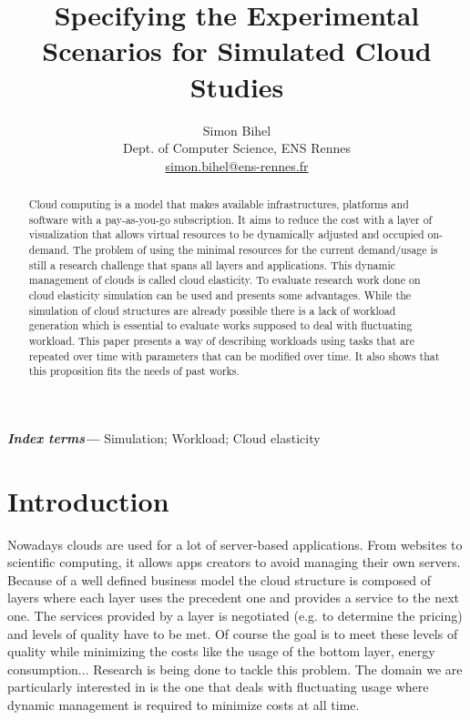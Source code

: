 \documentclass[a4paper, onecolumn, 11pt]{article}
\title{Specifying the Experimental Scenarios for Simulated Cloud Studies}
\author{Simon Bihel \\ Dept. of Computer Science, ENS Rennes\\
  \href{mailto:simon.bihel@ens-rennes.fr}{simon.bihel@ens-rennes.fr}}
\begin{document}
\maketitle

\begin{abstract}
  Cloud computing is a model that makes available infrastructures, platforms and
  software with a pay-as-you-go subscription. It aims to reduce the cost with a
  layer of visualization that allows virtual resources to be dynamically
  adjusted and occupied on-demand. The problem of using the minimal resources
  for the current demand/usage is still a research challenge that spans all
  layers and applications. This dynamic management of clouds is called cloud
  elasticity. To evaluate research work done on cloud elasticity simulation can
  be used and presents some advantages. While the simulation of cloud structures
  are already possible there is a lack of workload generation which is essential
  to evaluate works supposed to deal with fluctuating workload. This paper
  presents a way of describing workloads using tasks that are repeated over time
  with parameters that can be modified over time. It also shows that this
  proposition fits the needs of past works.
\end{abstract}

\providecommand{\keywords}[1]{\textbf{\textit{Index terms---}} #1}
\keywords{Simulation; Workload; Cloud elasticity}

\section{Introduction} \label{intro}
  Nowadays clouds are used for a lot of server-based applications. From websites
  to scientific computing, it allows apps creators to avoid managing their own
  servers. Because of a well defined business model the cloud structure is
  composed of layers where each layer uses the precedent one and provides a
  service to the next one. The services provided by a layer is negotiated (e.g.
  to determine the pricing) and levels of quality have to be met. Of course the
  goal is to meet these levels of quality while minimizing the costs like the
  usage of the bottom layer, energy consumption... Research is being done to
  tackle this problem. The domain we are particularly interested in is the one
  that deals with fluctuating usage where dynamic management is required to
  minimize costs at all time.
  
\end{document}
